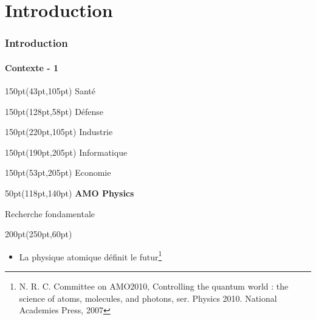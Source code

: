 \section{Introduction}


\begin{frame}
\frametitle{Introduction}
\framesubtitle{Contexte - 1}


\begin{textblock*}{150pt}(43pt,105pt)
\footnotesize
Sant\'e
\end{textblock*}

\begin{textblock*}{150pt}(128pt,58pt)
\footnotesize
D\'efense
\end{textblock*}

\begin{textblock*}{150pt}(220pt,105pt)
\footnotesize
Industrie
\end{textblock*}

\begin{textblock*}{150pt}(190pt,205pt)
\footnotesize
Informatique
\end{textblock*}

\begin{textblock*}{150pt}(53pt,205pt)
\footnotesize
Economie
\end{textblock*}


\begin{textblock*}{50pt}(118pt,140pt)
\footnotesize\centering
\textbf{AMO Physics}\par
Recherche fondamentale
\end{textblock*}


\begin{textblock*}{200pt}(250pt,60pt)
\footnotesize
\begin{itemize}
\item La physique atomique d\'efinit le futur\footnote{\Tiny
N. R. C. Committee on AMO2010, Controlling the quantum world : the science of atoms,
molecules, and photons, ser. Physics 2010. National Academies Press, 2007}
\end{itemize}
\end{textblock*}



\end{frame}
